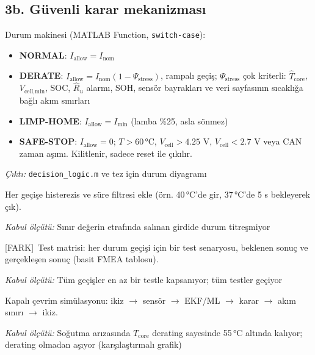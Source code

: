 \documentclass[11pt,a4paper]{article}
\newcommand{\cikti}[1]{\par{\small\textit{Çıktı:} #1}}
\newcommand{\kabul}[1]{\par{\small\textit{Kabul ölçütü:} #1}}
\newcommand{\artı}{\textcolor{ana}{\small[FARK]}\ }
\begin{document}
\subsection*{3b. Güvenli karar mekanizması}
\begin{gorev}
  \item Durum makinesi (MATLAB Function, \texttt{switch-case}):
  \begin{itemize}[leftmargin=1.2em,itemsep=0pt]
    \item \textbf{NORMAL}: $I_\text{allow}=I_\text{nom}$
    \item \textbf{DERATE}: $I_\text{allow}=I_\text{nom}(1-\Psi_\text{stress})$, rampalı geçiş; $\Psi_\text{stress}$ çok kriterli: $\hat T_\text{core}$, $V_\text{cell,min}$, SOC, $\hat R_u$ alarmı, SOH, sensör bayrakları ve veri sayfasının sıcaklığa bağlı akım sınırları
    \item \textbf{LIMP-HOME}: $I_\text{allow}=I_\text{min}$ (lamba \%25, asla sönmez)
    \item \textbf{SAFE-STOP}: $I_\text{allow}=0$; $T>60$\,°C, $V_\text{cell}>4.25$ V, $V_\text{cell}<2.7$ V veya CAN zaman aşımı. Kilitlenir, sadece reset ile çıkılır.
  \end{itemize}
  \cikti{\texttt{decision\_logic.m} ve tez için durum diyagramı}
  \item Her geçişe histerezis ve süre filtresi ekle (örn. 40\,°C'de gir, 37\,°C'de 5 s bekleyerek çık).
  \kabul{Sınır değerin etrafında salınan girdide durum titreşmiyor}
  \item \artı Test matrisi: her durum geçişi için bir test senaryosu, beklenen sonuç ve gerçekleşen sonuç (basit FMEA tablosu).
  \kabul{Tüm geçişler en az bir testle kapsanıyor; tüm testler geçiyor}
  \item Kapalı çevrim simülasyonu: ikiz $\rightarrow$ sensör $\rightarrow$ EKF/ML $\rightarrow$ karar $\rightarrow$ akım sınırı $\rightarrow$ ikiz.
  \kabul{Soğutma arızasında $T_\text{core}$ derating sayesinde 55\,°C altında kalıyor; derating olmadan aşıyor (karşılaştırmalı grafik)}
\end{gorev}

\end{document}

